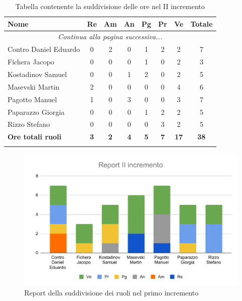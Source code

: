 \documentclass[../piano_di_progetto.tex]{subfiles}
\begin{document}
\begin{center}
	\begin{longtable}{|l|c|c|c|c|c|c|c|}
		\hline
		\rowcolor{lightgray}
		\textbf{Nome} & \textbf{Re} & \textbf{Am} & \textbf{An} & \textbf{Pg}  & \textbf{Pr}   & \textbf{Ve} & \textbf{Totale} \\
		\hline
		\endhead
		
		\hline
		\multicolumn{8}{|c|}{\emph{Continua alla pagina successiva...}}\\
		\hline
		\endfoot

		\endlastfoot
		
		\hline
			Contro Daniel Eduardo & 0 & 2 & 0 & 1 & 2 & 2 & 7\\
			Fichera Jacopo & 0 & 0 & 0 & 1 & 0 & 2 & 3 \\
			Kostadinov Samuel & 0 & 0 & 1 & 2 & 0 & 2 & 5 \\			
			Masevski Martin 	& 2 & 0 & 0 & 0 & 0 & 4 & 6\\
			Pagotto Manuel & 1 & 0 & 3 & 0 & 0 & 3 & 7 \\			
			Paparazzo Giorgia & 0 & 0 & 0 & 1 & 2 & 2 & 5 \\
			Rizzo Stefano & 0 & 0 & 0 & 0 & 3 & 2 & 5\\
			\hline
		\textbf{Ore totali ruoli} & \textbf{3} & \textbf{2} & \textbf{4} & \textbf{5} & \textbf{7} & \textbf{17} & \textbf{38} \\
		\hline	
		\rowcolor{white}
		\caption{Tabella contenente la suddivisione delle ore nel II incremento}
	\end{longtable}
\end{center}
 
\begin{figure}[H]
	\centering
	\includegraphics[width=13cm]{src/img/report/report_2_incremento.pdf}
	\caption{Report della suddivisione dei ruoli nel primo incremento}
\end{figure}
\end{document}
